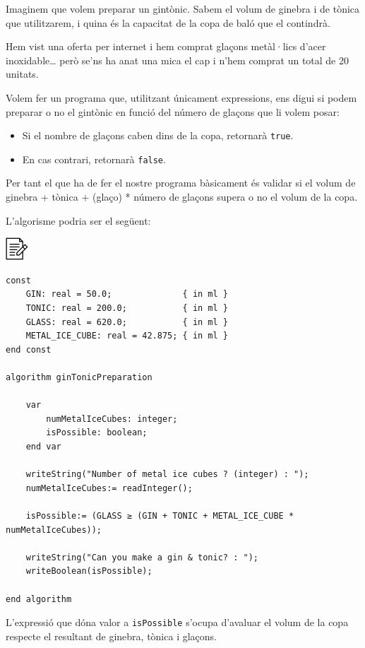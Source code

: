 \documentclass[
]{book}
\providecommand{\tightlist}{%
  \setlength{\itemsep}{0pt}\setlength{\parskip}{0pt}}
\begin{document}
Imaginem que volem preparar un gintònic. Sabem el volum de ginebra i de tònica que utilitzarem, i quina és la capacitat de la copa de baló que el contindrà.

Hem vist una oferta per internet i hem comprat glaçons metàl·lics d'acer inoxidable\ldots{} però se'ns ha anat una mica el cap i n'hem comprat un total de 20 unitats.

Volem fer un programa que, utilitzant únicament expressions, ens digui si podem preparar o no el gintònic en funció del número de glaçons que li volem posar:

\begin{itemize}
\tightlist
\item
  Si el nombre de glaçons caben dins de la copa, retornarà \texttt{true}.
\item
  En cas contrari, retornarà \texttt{false}.
\end{itemize}

Per tant el que ha de fer el nostre programa bàsicament és validar si el volum de ginebra + tònica + (glaço) * número de glaçons supera o no el volum de la copa.

L'algorisme podria ser el següent:

\includegraphics{./img/alg.png}

\begin{verbatim}
const
    GIN: real = 50.0;              { in ml }
    TONIC: real = 200.0;           { in ml }
    GLASS: real = 620.0;           { in ml }
    METAL_ICE_CUBE: real = 42.875; { in ml }
end const

algorithm ginTonicPreparation

    var
        numMetalIceCubes: integer;
        isPossible: boolean;
    end var

    writeString("Number of metal ice cubes ? (integer) : ");
    numMetalIceCubes:= readInteger();

    isPossible:= (GLASS ≥ (GIN + TONIC + METAL_ICE_CUBE * numMetalIceCubes));

    writeString("Can you make a gin & tonic? : ");
    writeBoolean(isPossible);

end algorithm
\end{verbatim}

L'expressió que dóna valor a \texttt{isPossible} s'ocupa d'avaluar el volum de la copa respecte el resultant de ginebra, tònica i glaçons.
\end{document}
